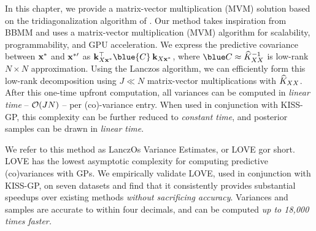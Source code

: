 In this chapter, we provide a matrix-vector multiplication (MVM) solution based on the tridiagonalization algorithm of \citet{lanczos1950iteration}.
Our method takes inspiration from BBMM and uses a matrix-vector multiplication (MVM) algorithm for scalability, programmability, and GPU acceleration.
We express the predictive covariance between $\mathbf{x}^*$ and $\mathbf{x}^{*\prime}$ as
$\bk_{\bX\bxtest}^\top \blue{\bC} \: \bk_{\bX\bxtest}$,
where $\blue \bC \approx \trainK^{-1}$ is low-rank $N \times N$ approximation.
Using the Lanczos algorithm, we can efficiently form this low-rank decomposition using $J \ll N$ matrix-vector multiplications with $\widehat{K}_{XX}$.
After this one-time upfront computation, all variances can be computed in \emph{linear time} -- $\bigo{JN}$ -- per (co)-variance entry.
When used in conjunction with KISS-GP, this complexity can be further reduced to \emph{constant time}, and posterior samples can be drawn in \emph{linear time}.

We refer to this method as LanczOs Variance Estimates, or LOVE{} gor short.
LOVE{} has the lowest asymptotic complexity for computing predictive (co)variances with GPs.
We empirically validate LOVE{}, used in conjunction with KISS-GP, on seven datasets and find that it consistently provides substantial speedups over existing methods \emph{without sacrificing accuracy}.
Variances and samples are accurate to within four decimals, and can be computed \emph{up to 18,000 times faster.}
